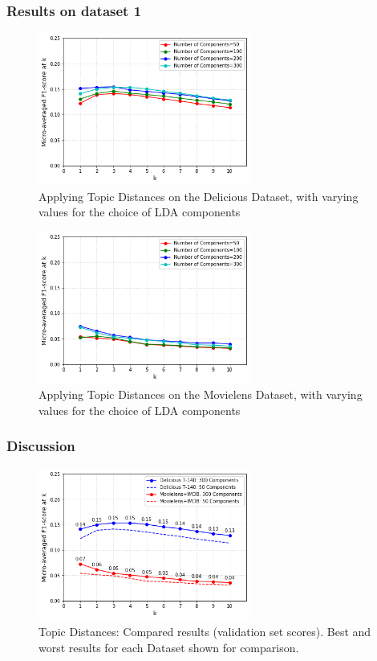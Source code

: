 \subsubsection{Results on dataset 1}

\begin{figure}[H]
    \centering
    \includegraphics[width=7cm]{chapters/05_experiments/images/delicious-topic-distances.png}
    \caption{Applying Topic Distances on the Delicious Dataset, with varying values for the choice of LDA components}
    \label{fig:topic_distances_delicious}
\end{figure}

\begin{figure}[H]
    \centering
    \includegraphics[width=7cm]{chapters/05_experiments/images/movielens-topic-distances.png}
    \caption{Applying Topic Distances on the Movielens Dataset, with varying values for the choice of LDA components}
    \label{fig:topic_distances_movielens}
\end{figure}

\subsubsection{Discussion}

\begin{figure}[H]
    \centering
    \includegraphics[width=7cm]{chapters/05_experiments/images/proposal-1-compared-topic-distances.png}
    \caption{Topic Distances: Compared results (validation set scores). Best and worst results for each Dataset shown for comparison.}
    \label{fig:compared_topic_distances}
\end{figure}

